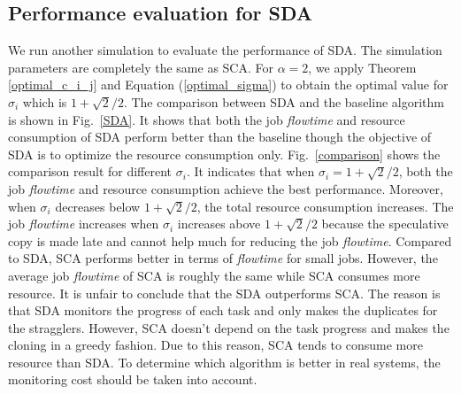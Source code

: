 \documentclass[10pt,conference]{IEEEtran}
\begin{document}
\subsection{Performance evaluation for SDA}
We run another simulation to evaluate the performance of SDA. The simulation parameters are completely the same as SCA. For $\alpha = 2$, we apply Theorem \ref{optimal_c_i_j} and Equation (\ref{optimal_sigma}) to obtain the optimal value for $\sigma_i$ which is $1 + \sqrt{2}/2$. The comparison between SDA and the baseline algorithm is shown in Fig.~\ref{SDA}. It shows that both the job \textit{flowtime} and resource consumption of SDA perform better than the baseline though the objective of SDA is to optimize the resource consumption only. Fig.~\ref{comparison} shows the comparison result for different $\sigma_i$. It indicates that when $\sigma_i = 1 + \sqrt{2}/2$, both the job \textit{flowtime} and resource consumption achieve the best performance. Moreover, when $\sigma_i$ decreases below $1 + \sqrt{2}/2$, the total resource consumption increases. The job \textit{flowtime} increases when $\sigma_i$ increases above $1 + \sqrt{2}/2$ because the speculative copy is made late and cannot help much for reducing the job \textit{flowtime}. Compared to SDA, SCA performs better in terms of \textit{flowtime} for small jobs. However, the average job \textit{flowtime} of SCA is roughly the same while SCA consumes more resource. It is unfair to conclude that the SDA outperforms SCA. The reason is that SDA monitors the progress of each task and only makes the duplicates for the stragglers. However, SCA doesn't depend on the task progress and makes the cloning in a greedy fashion. Due to this reason, SCA tends to consume more resource than SDA. To determine which algorithm is better in real systems, the monitoring cost should be taken into account.
\end{document}
